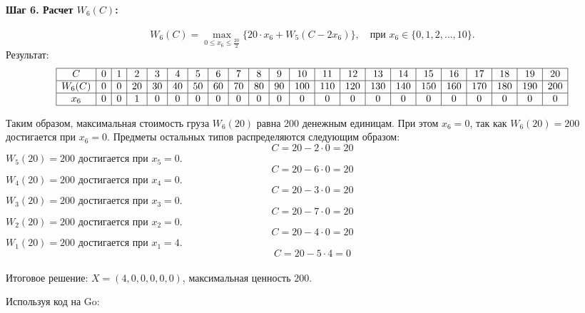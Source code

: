 \documentclass{article}
\begin{document}
\paragraph*{Шаг 6. Расчет $W_6(C)$:}
\[
    W_6(C) = \max_{0 \leq x_6 \leq \frac{20}{2}} \{ 20 \cdot x_6 + W_5(C - 2 x_6) \}, \quad \text{при } x_6 \in \{0, 1, 2, \dots, 10\}.
\]
Результат:
\[
    \begin{array}{|c|c|c|c|c|c|c|c|c|c|c|c|c|c|c|c|c|c|c|c|c|c|}
        \hline
        C      & 0 & 1 & 2  & 3  & 4  & 5  & 6  & 7  & 8  & 9  & 10  & 11  & 12  & 13  & 14  & 15  & 16  & 17  & 18  & 19  & 20  \\
        \hline
        W_6(C) & 0 & 0 & 20 & 30 & 40 & 50 & 60 & 70 & 80 & 90 & 100 & 110 & 120 & 130 & 140 & 150 & 160 & 170 & 180 & 190 & 200 \\
        \hline
        x_6    & 0 & 0 & 1  & 0  & 0  & 0  & 0  & 0  & 0  & 0  & 0   & 0   & 0   & 0   & 0   & 0   & 0   & 0   & 0   & 0   & 0   \\
        \hline
    \end{array}
\]

Таким образом, максимальная стоимость груза $W_6(20)$ равна 200 денежным единицам.
При этом $x_6 = 0$, так как $W_6(20) = 200$ достигается при $x_6=0$.
Предметы остальных типов распределяются следующим образом:
\[
    C = 20 - 2 \cdot 0 = 20
\]
$W_5(20) = 200$ достигается при $x_5 = 0$.
\[
    C = 20 - 6 \cdot 0 = 20
\]
$W_4(20) = 200$ достигается при $x_4 = 0$.
\[
    C = 20 - 3 \cdot 0 = 20
\]
$W_3(20) = 200$ достигается при $x_3 = 0$.
\[
    C = 20 - 7 \cdot 0 = 20
\]
$W_2(20) = 200$ достигается при $x_2 = 0$.
\[
    C = 20 - 4 \cdot 0 = 20
\]
$W_1(20) = 200$ достигается при $x_1 = 4$.
\[
    C = 20 - 5 \cdot 4 = 0
\]\\
Итоговое решение: $X = (4, 0, 0, 0, 0, 0)$, максимальная ценность $200$.

Используя код на Go:
\end{document}
